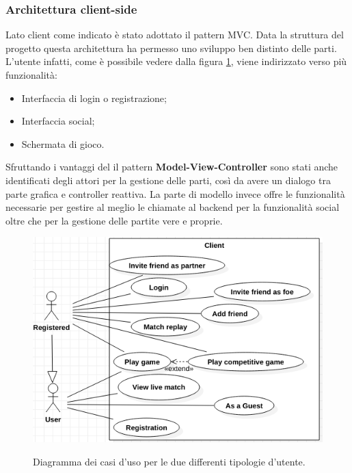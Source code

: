             \subsubsection{Architettura client-side}\label{subsub:architecture:client}
            Lato client come indicato è stato adottato il pattern MVC. Data la struttura del progetto questa architettura ha permesso uno sviluppo ben distinto delle parti.
            \\
            L'utente infatti, come è possibile vedere dalla figura \ref{fig:UserUseCaseDiagram}, viene indirizzato verso più funzionalità:
            \begin{itemize}
             \item Interfaccia di login o registrazione;
             \item Interfaccia social;
             \item Schermata di gioco.
            \end{itemize}
            Sfruttando i vantaggi del il pattern \textbf{Model-View-Controller} sono stati anche identificati degli attori per la gestione delle parti, così da avere un dialogo tra parte grafica e controller reattiva. 
            La parte di modello invece offre le funzionalità necessarie per gestire al meglio le chiamate al backend per la funzionalità social oltre che per la gestione delle partite vere e proprie.
            
            
	     \begin{figure}[!h]
                \includegraphics[scale=0.7]{image/UserUseCaseDiagram.png}
                \label{fig:UserUseCaseDiagram}
                \caption{Diagramma dei casi d'uso per le due differenti tipologie d'utente.}
            \end{figure}
            
